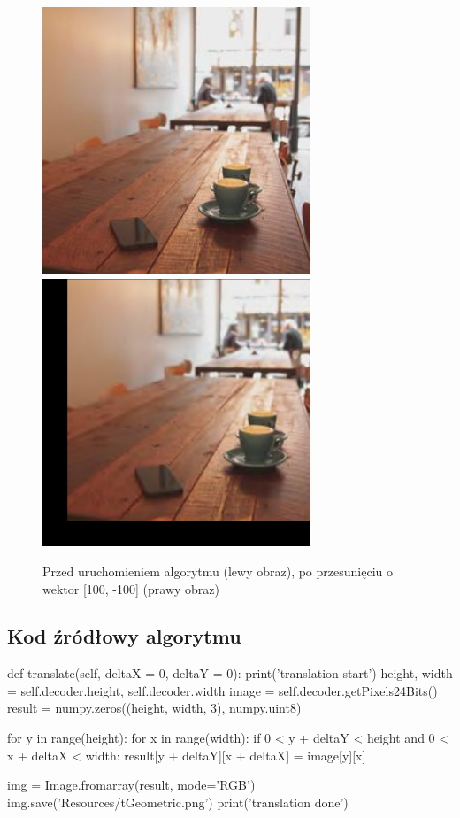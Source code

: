 \documentclass[a4paper,12pt]{book}
\begin{document}
\begin{figure}[H]
	\caption{Przed uruchomieniem algorytmu (lewy obraz), po przesunięciu o wektor [100, -100] (prawy obraz)}
	\includegraphics[width=8cm, height=8cm]{coffee-unmodified.jpg}
	\includegraphics[width=8cm, height=8cm]{coffee-translate.png}
\end{figure}
\subsection*{Kod źródłowy algorytmu}
\begin{python}
def translate(self, deltaX = 0, deltaY = 0):
	print('translation start')
	height, width = self.decoder.height, self.decoder.width
	image = self.decoder.getPixels24Bits()
	result = numpy.zeros((height, width, 3), numpy.uint8)
	
	for y in range(height):
		for x in range(width):  
			if 0 < y + deltaY < height and 0 < x + deltaX < width:
				result[y + deltaY][x + deltaX] = image[y][x]
	
	img = Image.fromarray(result, mode='RGB')
	img.save('Resources/tGeometric.png')
print('translation done')
\end{python}
\end{document}
